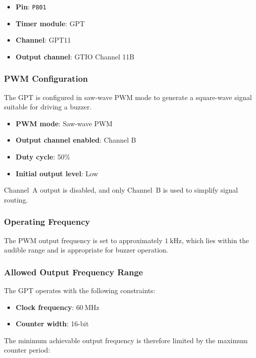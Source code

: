\documentclass[12pt]{article}
\begin{document}
\begin{itemize}
    \item \textbf{Pin}: \texttt{P801}
    \item \textbf{Timer module}: GPT
    \item \textbf{Channel}: GPT11
    \item \textbf{Output channel}: GTIO Channel 11B
\end{itemize}


\subsubsection{PWM Configuration}

The GPT is configured in saw-wave PWM mode to generate a square-wave signal suitable for driving a buzzer.

\begin{itemize}
    \item \textbf{PWM mode}: Saw-wave PWM
    \item \textbf{Output channel enabled}: Channel B
    \item \textbf{Duty cycle}: 50\%
    \item \textbf{Initial output level}: Low
\end{itemize}

Channel~A output is disabled, and only Channel~B is used to simplify signal routing.

\subsubsection{Operating Frequency}

The PWM output frequency is set to approximately $1~\text{kHz}$, which lies within the audible range and is appropriate for buzzer operation.

\subsubsection{Allowed Output Frequency Range}

The GPT operates with the following constraints:

\begin{itemize}
    \item \textbf{Clock frequency}: $60~\text{MHz}$
    \item \textbf{Counter width}: 16-bit
\end{itemize}

The minimum achievable output frequency is therefore limited by the maximum counter period:
\end{document}
